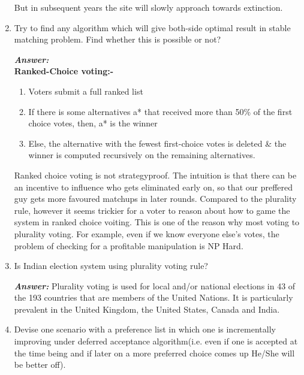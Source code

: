 \documentclass[15pt]{article}
\begin{document}
\begin{enumerate}
But in subsequent years the site will slowly approach towards extinction.\\


\item Try to find any algorithm which will give both-side optimal result in stable matching problem. Find whether this is possible or not?

\textbf{\emph{Answer: }}\\ \textbf{Ranked-Choice voting:-}
\begin{enumerate}
\item Voters submit a full ranked list
\item If there is some alternatives a* that received more than 50\% of the first choice votes,
then, a* is the winner
\item Else, the alternative with the fewest first-choice votes is deleted \& the winner is computed recursively on the remaining alternatives.
\end{enumerate}
Ranked choice voting is not strategyproof. The intuition is that there can be an incentive to influence who gets eliminated early on, so that our preffered guy gets more favoured matchups in later rounds. Compared to the plurality rule, however it seems trickier for a voter to reason about how to game the system in ranked choice voiting. This is one of the reason why most voting to plurality voting.
For example, even if we know everyone else's votes, the problem of checking for a profitable manipulation is NP Hard.\\

\item 
Is Indian election system using plurality voting rule?

\textbf{\emph{Answer: }} Plurality voting is used for local and/or national elections in 43 of the 193 countries that are members of the United Nations. It is particularly prevalent in the United Kingdom, the United States, Canada and India.

\item 
Devise one scenario with a preference list in which one is incrementally improving under deferred acceptance algorithm(i.e. even if one is accepted at the time being and if later on a more preferred choice comes up He/She will be better off).


\end{enumerate}
\end{document}
